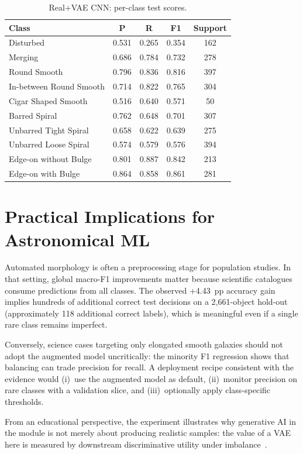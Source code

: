 \documentclass[conference]{IEEEtran}
\begin{document}
\begin{table}[t]
\caption{Real+VAE CNN: per-class test scores.}
\label{tab:fullB}
\centering
\scriptsize
\begin{tabular}{lcccc}
\toprule
Class & P & R & F1 & Support \\
\midrule
Disturbed & 0.531 & 0.265 & 0.354 & 162 \\
Merging & 0.686 & 0.784 & 0.732 & 278 \\
Round Smooth & 0.796 & 0.836 & 0.816 & 397 \\
In-between Round Smooth & 0.714 & 0.822 & 0.765 & 304 \\
Cigar Shaped Smooth & 0.516 & 0.640 & 0.571 & 50 \\
Barred Spiral & 0.762 & 0.648 & 0.701 & 307 \\
Unbarred Tight Spiral & 0.658 & 0.622 & 0.639 & 275 \\
Unbarred Loose Spiral & 0.574 & 0.579 & 0.576 & 394 \\
Edge-on without Bulge & 0.801 & 0.887 & 0.842 & 213 \\
Edge-on with Bulge & 0.864 & 0.858 & 0.861 & 281 \\
\bottomrule
\end{tabular}
\end{table}

\section{Practical Implications for Astronomical ML}
Automated morphology is often a preprocessing stage for population studies. In that setting, global macro-F1 improvements matter because scientific catalogues consume predictions from all classes. The observed +4.43~pp accuracy gain implies hundreds of additional correct test decisions on a 2{,}661-object hold-out (approximately 118 additional correct labels), which is meaningful even if a single rare class remains imperfect.

Conversely, science cases targeting only elongated smooth galaxies should not adopt the augmented model uncritically: the minority F1 regression shows that balancing can trade precision for recall. A deployment recipe consistent with the evidence would (i)~use the augmented model as default, (ii)~monitor precision on rare classes with a validation slice, and (iii)~optionally apply class-specific thresholds.

From an educational perspective, the experiment illustrates why generative AI in the module is not merely about producing realistic samples: the value of a VAE here is measured by downstream discriminative utility under imbalance~\cite{aggarwal2018neural,zhang2023dive}.
\end{document}
